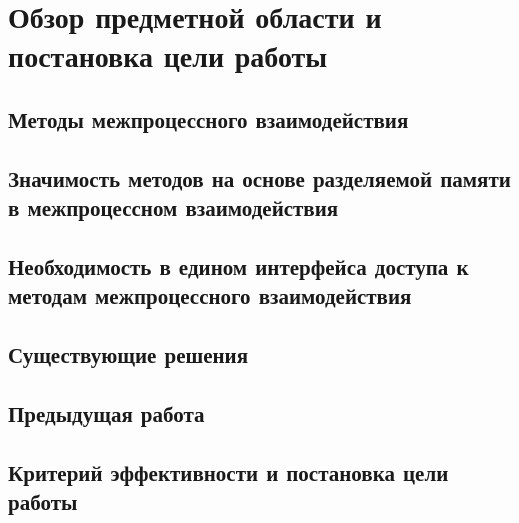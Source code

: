 \chapter{Обзор предметной области и постановка цели работы}

\startrelatedwork

\section{Методы межпроцессного взаимодействия}

\section{Значимость методов на основе разделяемой памяти в межпроцессном взаимодействия}

\section{Необходимость в едином интерфейса доступа к методам межпроцессного взаимодействия}

\section{Существующие решения}

\section{Предыдущая работа}

\finishrelatedwork

\section{Критерий эффективности и постановка цели работы}


\chapterconclusion

